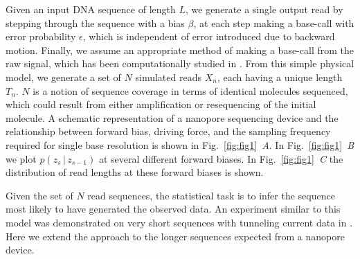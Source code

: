 \documentclass{biophys_letter}
\newcommand{\bias}{\beta}
\newcommand{\err}{\epsilon}
\newcommand{\kje}[1]{\textcolor{BurntOrange}{#1}}
\begin{document}
\begin{multicols}{2}
Given an input DNA sequence of length $L$, we generate a single output read by stepping through the sequence with a bias $\bias$, at each step making a base-call with error probability $\err$, which is independent of error introduced due to backward motion.
Finally, we assume an appropriate method of making a base-call from the raw signal, which has been computationally studied in \cite{ODonnell:2013}.
From this simple physical model, we generate a set of $N$ simulated reads $X_n$, each having a unique length $T_{n}$.
$N$ is a notion of sequence coverage in terms of identical molecules sequenced, which could result from either amplification or resequencing of the initial molecule.
\kje{
A schematic representation of a nanopore sequencing device and the relationship between forward bias, driving force, and the sampling frequency required for single base resolution is shown in Fig.~\ref{fig:fig1}\emph{~A}.
In Fig.~\ref{fig:fig1}\emph{~B} we plot $p(z_s \,|\, z_{s-1})$ at several different forward biases.
In Fig.~\ref{fig:fig1}\emph{~C} the distribution of read lengths at these forward biases is shown.
}

\end{multicols}
\twocolumn

Given the set of $N$ read sequences, the statistical task is to infer the sequence most likely to have generated the observed data.
An experiment similar to this model was demonstrated on very short sequences with tunneling current data in \cite{Ohshiro:2012}.
Here we extend the approach to the longer sequences expected from a nanopore device.
\end{document}
